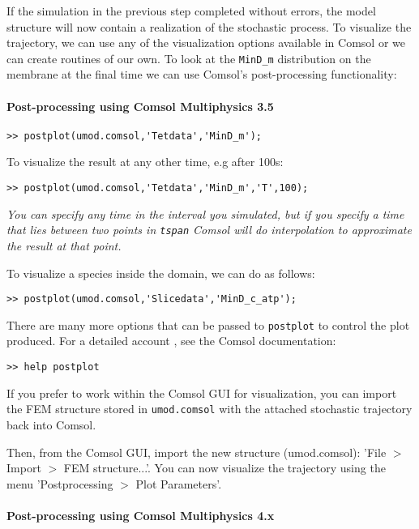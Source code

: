 If the simulation in the previous step completed without errors, the
model structure will now contain a realization of the stochastic
process. To visualize the trajectory, we can use any of the
visualization options available in Comsol or we can create routines of
our own. To look at the \texttt{MinD\_m} distribution on the membrane
at the final time we can use Comsol's post-processing functionality:

\paragraph*{Post-processing using Comsol Multiphysics 3.5}

\begin{verbatim}
>> postplot(umod.comsol,'Tetdata','MinD_m');
\end{verbatim} 

To visualize the result at any other time, e.g after 100s:
\begin{verbatim}
>> postplot(umod.comsol,'Tetdata','MinD_m','T',100);
\end{verbatim}

 {\color{red}{\bf {!}}} \emph{You can specify any time in the interval
   you simulated, but if you specify a time that lies between two
   points in \texttt{tspan} Comsol will do interpolation to
   approximate the result at that point.}

\noindent
To visualize a species inside the domain, we can do as follows:

\begin{verbatim}
>> postplot(umod.comsol,'Slicedata','MinD_c_atp');
\end{verbatim} 

\noindent
There are many more options that can be passed to \texttt{postplot} to
control the plot produced. For a detailed account , see the Comsol
documentation:
\begin{verbatim}
>> help postplot
\end{verbatim}

\noindent
If you prefer to work within the Comsol GUI for visualization, you can
import the FEM structure stored in \texttt{umod.comsol} with the attached stochastic trajectory back
into Comsol. 

\noindent
Then, from the Comsol GUI, import the new structure (umod.comsol): 'File $>$
Import $>$ FEM structure...'. You can now visualize the trajectory
using the menu 'Postprocessing $>$ Plot Parameters'.
\paragraph*{Post-processing using Comsol Multiphysics 4.x} 

